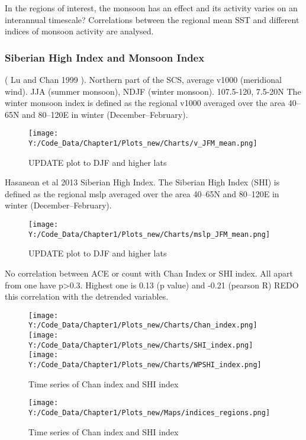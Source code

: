 In the regions of interest, the monsoon has an effect and its activity varies on an interannual timescale?
Correlations between the regional mean SST and different indices of monsoon activity are analysed.

\subsubsection{Siberian High Index and Monsoon Index}

 ( Lu and Chan 1999 ). Northern part of the SCS, average v1000 (meridional wind). JJA (summer monsoon), NDJF (winter monsoon). 107.5-120, 7.5-20N
The winter monsoon index is defined as the regional v1000 averaged over the area 40–65N and 80–120E in winter (December–February).
%
\begin{figure}[h]
	\centering
	\noindent\texttt{[image: Y:/Code\_Data/Chapter1/Plots\_new/Charts/v\_JFM\_mean.png]}
	\caption{UPDATE plot to DJF and higher lats}\label{fig:Chan_wind}
\end{figure}


Hasanean et al 2013 Siberian High Index. 
The Siberian High Index (SHI) is defined as the regional mslp averaged over the area 40–65N and 80–120E in winter (December–February).

\begin{figure}[h]
	\centering
	\noindent\texttt{[image: Y:/Code\_Data/Chapter1/Plots\_new/Charts/mslp\_JFM\_mean.png]}
	\caption{UPDATE plot to DJF and higher lats}\label{fig:Siberian_high}
\end{figure}


No correlation between ACE or count with Chan Index or SHI index. All apart from one have p>0.3. Highest one is 0.13 (p value) and -0.21 (pearson R)
REDO this correlation with the detrended variables.

\begin{figure}[h]
	\centering
	\noindent\texttt{[image: Y:/Code\_Data/Chapter1/Plots\_new/Charts/Chan\_index.png]}
	\noindent\texttt{[image: Y:/Code\_Data/Chapter1/Plots\_new/Charts/SHI\_index.png]}
	\noindent\texttt{[image: Y:/Code\_Data/Chapter1/Plots\_new/Charts/WPSHI\_index.png]}
		\caption{Time series of Chan index and SHI index}\label{fig:Chan_SHI}
\end{figure}

\begin{figure}[h]
	\centering
	\noindent\texttt{[image: Y:/Code\_Data/Chapter1/Plots\_new/Maps/indices\_regions.png]}

	\caption{Time series of Chan index and SHI index}\label{fig:index_regions}
\end{figure}



